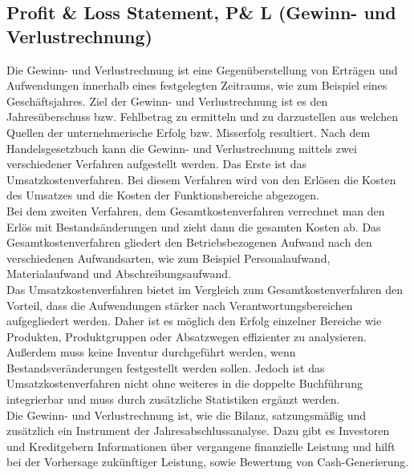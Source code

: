 \subsection{Profit \& Loss Statement, P\& L (Gewinn- und Verlustrechnung)}
Die Gewinn- und Verlustrechnung ist eine Gegenüberstellung von Erträgen und Aufwendungen innerhalb eines festgelegten Zeitraums, wie zum Beispiel eines Geschäftsjahres. Ziel der Gewinn- und Verlustrechnung ist es den Jahresüberschuss bzw. Fehlbetrag zu ermitteln und zu darzustellen aus welchen Quellen der unternehmerische Erfolg bzw. Misserfolg resultiert. Nach dem Handelsgesetzbuch kann die Gewinn- und Verlustrechnung mittels zwei verschiedener Verfahren aufgestellt werden. Das Erste ist das Umsatzkostenverfahren. Bei diesem Verfahren wird von den Erlösen die Kosten des Umsatzes und die Kosten der Funktionsbereiche abgezogen.
\\
Bei dem zweiten Verfahren, dem Gesamtkostenverfahren verrechnet man den Erlös mit Bestandsänderungen und zieht dann die gesamten Kosten ab. Das Gesamtkostenverfahren gliedert den Betriebsbezogenen Aufwand nach den verschiedenen Aufwandsarten, wie zum Beispiel Personalaufwand, Materialaufwand und Abschreibungsaufwand.
\\
Das Umsatzkostenverfahren bietet im Vergleich zum Gesamtkostenverfahren den Vorteil, dass die Aufwendungen stärker nach Verantwortungsbereichen aufgegliedert werden. Daher ist es möglich den Erfolg einzelner Bereiche wie Produkten, Produktgruppen oder Absatzwegen effizienter zu analysieren. Außerdem muss keine Inventur durchgeführt werden, wenn Bestandsveränderungen festgestellt werden sollen.
Jedoch ist das Umsatzkostenverfahren nicht ohne weiteres in die doppelte Buchführung integrierbar und muss durch zusätzliche Statistiken ergänzt werden.\cite{umsatzkosten}
\\
Die Gewinn- und Verlustrechnung ist, wie die Bilanz, satzungsmäßig und zusätzlich ein Instrument der Jahresabschlussanalyse. Dazu gibt es Investoren und Kreditgebern Informationen über vergangene finanzielle Leistung und hilft bei der Vorhersage zukünftiger Leistung, sowie Bewertung von Cash-Generierung.

